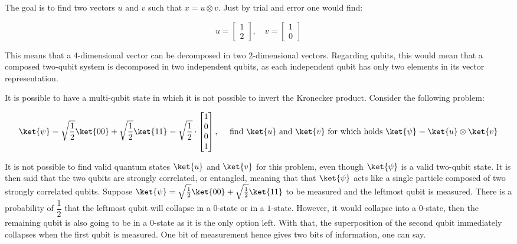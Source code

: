 \documentclass[../main.tex]{subfiles}
\begin{document}
The goal is to find two vectors $u$ and $v$ such that $x = u \otimes v$. Just by trial and error one would find:

\begin{equation*}
    u = \begin{bmatrix} 1 \\ 2 \end{bmatrix}, \quad  v = \begin{bmatrix} 1 \\ 0 \end{bmatrix}
\end{equation*}

This means that a $4$-dimensional vector can be decomposed in two $2$-dimensional vectors. Regarding qubits, this would mean that a composed two-qubit system is decomposed in two independent qubits, as each independent qubit has only two elements in its vector representation.

It is possible to have a multi-qubit state in which it is not possible to invert the Kronecker product. Consider the following problem:

\begin{equation*}
    \ket{\psi} = \sqrt{\frac{1}{2}} \ket{00} + \sqrt{\frac{1}{2}} \ket{11} = \sqrt{\frac{1}{2}} \cdot \begin{bmatrix} 1 \\ 0 \\ 0 \\ 1 \end{bmatrix}, \quad  \text{ find } \ket{u} \text{ and } \ket{v} \text{ for which holds } \ket{\psi} = \ket{u} \otimes \ket{v}
\end{equation*}

It is not possible to find valid quantum states $\ket{u}$ and $\ket{v}$ for this problem, even though $\ket{\psi}$ is a valid two-qubit state. It is then said that the two qubits are strongly correlated, or entangled, meaning that that $\ket{\psi}$ acts like a single particle composed of two strongly correlated qubits. Suppose $\ket{\psi} = \sqrt{\frac{1}{2}} \ket{00} + \sqrt{\frac{1}{2}} \ket{11}$ to be measured and the leftmost qubit is measured. There is a probability of $\dfrac{1}{2}$ that the leftmost qubit will collapse in a $0$-state or in a $1$-state. However, it would collapse into a $0$-state, then the remaining qubit is also going to be in a $0$-state as it is the only option left. With that, the superposition of the second qubit immediately collapses when the first qubit is measured. One bit of measurement hence gives two bits of information, one can say.
\end{document}
